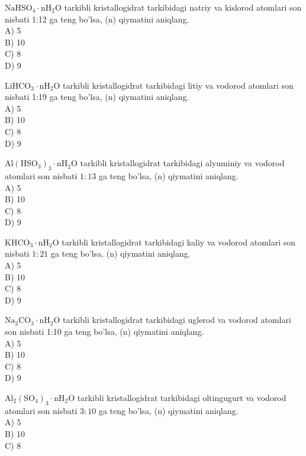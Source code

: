  \setcounter{enumi}{31}
  \item $\mathrm{NaHSO}_{4} \cdot \mathrm{nH}_{2} \mathrm{O}$ tarkibli kristallogidrat tarkibidagi natriy va kislorod atomlari son nisbati 1:12 ga teng bo'lsa, (n) qiymatini aniqlang.\\
A) 5\\
B) 10\\
C) 8\\
D) 9
  \item $\mathrm{LiHCO}_{3} \cdot \mathrm{nH}_{2} \mathrm{O}$ tarkibli kristallogidrat tarkibidagi litiy va vodorod atomlari son\\
nisbati 1:19 ga teng bo'lsa, (n) qiymatini aniqlang.\\
A) 5\\
B) 10\\
C) 8\\
D) 9
  \item $\mathrm{Al}\left(\mathrm{HSO}_{3}\right)_{3} \cdot \mathrm{nH}_{2} \mathrm{O}$ tarkibli kristallogidrat tarkibidagi alyuminiy va vodorod atomlari son nisbati $1: 13$ ga teng bo'lsa, (n) qiymatini aniqlang.\\
A) 5\\
B) 10\\
C) 8\\
D) 9
  \item $\mathrm{KHCO}_{3} \cdot \mathrm{nH}_{2} \mathrm{O}$ tarkibli kristallogidrat tarkibidagi kaliy va vodorod atomlari son nisbati $1: 21$ ga teng bo'lsa, (n) qiymatini aniqlang.\\
A) 5\\
B) 10\\
C) 8\\
D) 9
  \item $\mathrm{Na}_{2} \mathrm{CO}_{3} \cdot \mathrm{nH}_{2} \mathrm{O}$ tarkibli kristallogidrat tarkibidagi uglerod va vodorod atomlari son nisbati 1:10 ga teng bo'lsa, (n) qiymatini aniqlang.\\
A) 5\\
B) 10\\
C) 8\\
D) 9
  \item $\mathrm{Al}_{2}\left(\mathrm{SO}_{4}\right)_{3} \cdot \mathrm{nH}_{2} \mathrm{O}$ tarkibli kristallogidrat tarkibidagi oltingugurt va vodorod atomlari son nisbati $3: 10$ ga teng bo'lsa, (n) qiymatini aniqlang.\\
A) 5\\
B) 10\\
C) 8\\
